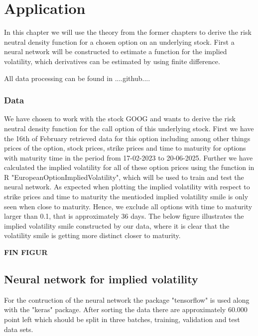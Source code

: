 \chapter{Application}\label{Ch.4}

In this chapter we will use the theory from the former chapters to derive the risk neutral density function for a chosen option on an underlying stock. First a neural network will be constructed to estimate a function for the implied volatility, which derivatives can be estimated by using finite difference. 

All data processing can be found in ....github....

\subsection{Data}
We have chosen to work with the stock GOOG and wants to derive the risk neutral density function for the call option of this underlying stock. First we have the 16th of February retrieved data for this option including among other things prices of the option, stock prices, strike prices and time to maturity for options with maturity time in the period from 17-02-2023 to 20-06-2025. Further we have calculated the implied volatility for all of these option prices using the function in R "EuropeanOptionImpliedVolatility", which will be used to train and test the neural network. As expected when plotting the implied volatility with respect to strike prices and time to maturity the mentioded implied volatility smile is only seen when close to maturity. Hence, we exclude all options with time to maturity larger than 0.1, that is approximately 36 days. The below figure illustrates the implied volatility smile constructed by our data, where it is clear that the volatility smile is getting more distinct closer to maturity. 

\textbf{FIN FIGUR}

\section{Neural network for implied volatility}
For the contruction of the neural network the package "tensorflow" is used along with the "keras" package. After sorting the data there are approximately 60.000 point left which should be split in three batches, training, validation and test data sets. 




